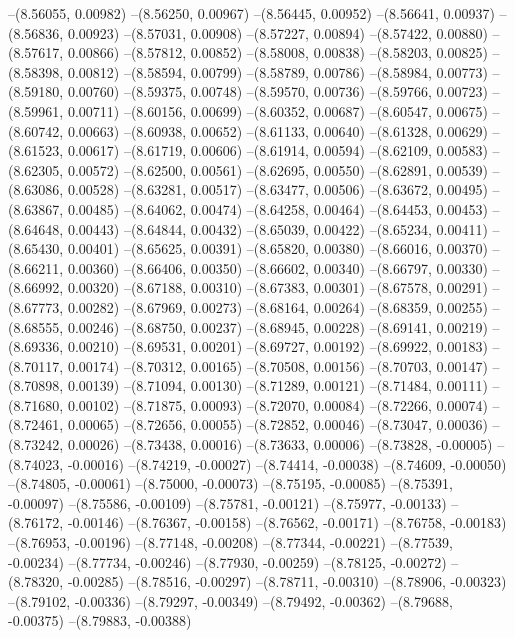 --(8.56055, 0.00982)
--(8.56250, 0.00967)
--(8.56445, 0.00952)
--(8.56641, 0.00937)
--(8.56836, 0.00923)
--(8.57031, 0.00908)
--(8.57227, 0.00894)
--(8.57422, 0.00880)
--(8.57617, 0.00866)
--(8.57812, 0.00852)
--(8.58008, 0.00838)
--(8.58203, 0.00825)
--(8.58398, 0.00812)
--(8.58594, 0.00799)
--(8.58789, 0.00786)
--(8.58984, 0.00773)
--(8.59180, 0.00760)
--(8.59375, 0.00748)
--(8.59570, 0.00736)
--(8.59766, 0.00723)
--(8.59961, 0.00711)
--(8.60156, 0.00699)
--(8.60352, 0.00687)
--(8.60547, 0.00675)
--(8.60742, 0.00663)
--(8.60938, 0.00652)
--(8.61133, 0.00640)
--(8.61328, 0.00629)
--(8.61523, 0.00617)
--(8.61719, 0.00606)
--(8.61914, 0.00594)
--(8.62109, 0.00583)
--(8.62305, 0.00572)
--(8.62500, 0.00561)
--(8.62695, 0.00550)
--(8.62891, 0.00539)
--(8.63086, 0.00528)
--(8.63281, 0.00517)
--(8.63477, 0.00506)
--(8.63672, 0.00495)
--(8.63867, 0.00485)
--(8.64062, 0.00474)
--(8.64258, 0.00464)
--(8.64453, 0.00453)
--(8.64648, 0.00443)
--(8.64844, 0.00432)
--(8.65039, 0.00422)
--(8.65234, 0.00411)
--(8.65430, 0.00401)
--(8.65625, 0.00391)
--(8.65820, 0.00380)
--(8.66016, 0.00370)
--(8.66211, 0.00360)
--(8.66406, 0.00350)
--(8.66602, 0.00340)
--(8.66797, 0.00330)
--(8.66992, 0.00320)
--(8.67188, 0.00310)
--(8.67383, 0.00301)
--(8.67578, 0.00291)
--(8.67773, 0.00282)
--(8.67969, 0.00273)
--(8.68164, 0.00264)
--(8.68359, 0.00255)
--(8.68555, 0.00246)
--(8.68750, 0.00237)
--(8.68945, 0.00228)
--(8.69141, 0.00219)
--(8.69336, 0.00210)
--(8.69531, 0.00201)
--(8.69727, 0.00192)
--(8.69922, 0.00183)
--(8.70117, 0.00174)
--(8.70312, 0.00165)
--(8.70508, 0.00156)
--(8.70703, 0.00147)
--(8.70898, 0.00139)
--(8.71094, 0.00130)
--(8.71289, 0.00121)
--(8.71484, 0.00111)
--(8.71680, 0.00102)
--(8.71875, 0.00093)
--(8.72070, 0.00084)
--(8.72266, 0.00074)
--(8.72461, 0.00065)
--(8.72656, 0.00055)
--(8.72852, 0.00046)
--(8.73047, 0.00036)
--(8.73242, 0.00026)
--(8.73438, 0.00016)
--(8.73633, 0.00006)
--(8.73828, -0.00005)
--(8.74023, -0.00016)
--(8.74219, -0.00027)
--(8.74414, -0.00038)
--(8.74609, -0.00050)
--(8.74805, -0.00061)
--(8.75000, -0.00073)
--(8.75195, -0.00085)
--(8.75391, -0.00097)
--(8.75586, -0.00109)
--(8.75781, -0.00121)
--(8.75977, -0.00133)
--(8.76172, -0.00146)
--(8.76367, -0.00158)
--(8.76562, -0.00171)
--(8.76758, -0.00183)
--(8.76953, -0.00196)
--(8.77148, -0.00208)
--(8.77344, -0.00221)
--(8.77539, -0.00234)
--(8.77734, -0.00246)
--(8.77930, -0.00259)
--(8.78125, -0.00272)
--(8.78320, -0.00285)
--(8.78516, -0.00297)
--(8.78711, -0.00310)
--(8.78906, -0.00323)
--(8.79102, -0.00336)
--(8.79297, -0.00349)
--(8.79492, -0.00362)
--(8.79688, -0.00375)
--(8.79883, -0.00388)
